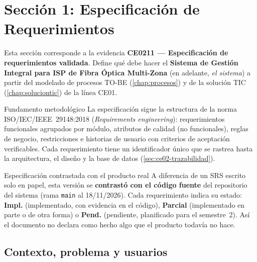 \section{Sección 1: Especificación de Requerimientos}
\label{chap:ce02-requerimientos}

Esta sección corresponde a la
evidencia \textbf{CE0211 — Especificación de requerimientos validada}. Define qué
debe hacer el \textbf{Sistema de Gestión Integral para ISP de Fibra Óptica
Multi-Zona} (en adelante, \emph{el sistema}) a partir del modelado de procesos TO-BE
(\cref{chap:procesos}) y de la solución TIC (\cref{chap:soluciontic}) de la línea
CE01.

\begin{upeubox}{Fundamento metodológico}
La especificación sigue la estructura de la norma ISO/IEC/IEEE~29148:2018
(\emph{Requirements engineering}): requerimientos funcionales agrupados por módulo,
atributos de calidad (no funcionales), reglas de negocio, restricciones e historias
de usuario con criterios de aceptación verificables. Cada requerimiento tiene un
identificador único que se rastrea hasta la arquitectura, el diseño y la base de
datos (\cref{sec:ce02-trazabilidad}).
\end{upeubox}

\begin{upeubox}{Especificación contrastada con el producto real}
A diferencia de un SRS escrito solo en papel, esta versión se \textbf{contrastó con el
código fuente} del repositorio del sistema (rama \texttt{main} al 18/11/2026). Cada
requerimiento indica su estado: \textbf{Impl.} (implementado, con evidencia en el
código), \textbf{Parcial} (implementado en parte o de otra forma) o
\textbf{Pend.} (pendiente, planificado para el semestre~2). Así el documento no
declara como hecho algo que el producto todavía no hace.
\end{upeubox}

\subsection{Contexto, problema y usuarios}
\label{sec:ce02-contexto}

